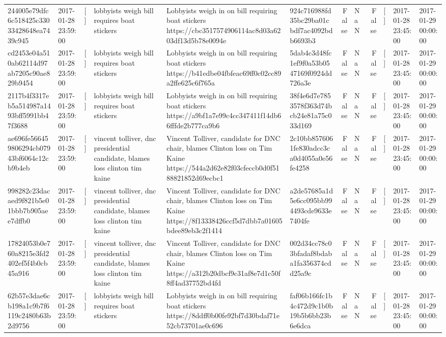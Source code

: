 \begin{tabular}{llllllrlrlll}
244005e79dfc6c518425c33033428648ea7439c945 & 2017-01-28 23:59:00 & [] & lobbyists weigh bill requires boat stickers & Lobbyists weigh in on bill requiring boat stickers https://cbc3517574906114ac8d03a6203df13d5b78e0094e & 924c716988fd35bc29ba01cbdf7ac4092bdb6693b3 & False & NaN & False & [] & 2017-01-28 23:45:00 & 2017-01-29 00:00:00 \\
cd2453e04a510ab62114d97ab7205c90ae829b9454 & 2017-01-28 23:59:00 & [] & lobbyists weigh bill requires boat stickers & Lobbyists weigh in on bill requiring boat stickers https://b41edbe04fbfeac69ff0c02cc89a2ffe625c6f765a & 5dab4c3d48fc1ef9f0a53b0547169f0924dd726a3e & False & NaN & False & [] & 2017-01-28 23:45:00 & 2017-01-29 00:00:00 \\
2117b4f3317eb5a514987a1493bff5991bb47f3688 & 2017-01-28 23:59:00 & [] & lobbyists weigh bill requires boat stickers & Lobbyists weigh in on bill requiring boat stickers https://a9bf1a7e99c4cc347411f14db66fffde2b777ca9b6 & 38f4e6d7e7853578f363d74bcb24e81a75c033d169 & False & NaN & False & [] & 2017-01-28 23:45:00 & 2017-01-29 00:00:00 \\
ae696fe566459806294cb07943bf6064c12cb9b4eb & 2017-01-28 23:59:00 & [] & vincent tolliver, dnc presidential candidate, blames loss clinton tim kaine & Vincent Tolliver, candidate for DNC chair, blames Clinton loss on Tim Kaine https://544a2d62e82f03cfeccb0d0f5188821852d69ecbc1 & 2c10bb8576061fe830adcc3ca0d4055a0e56fe4258 & False & NaN & False & [] & 2017-01-28 23:45:00 & 2017-01-29 00:00:00 \\
998282c23dacaed9f821b5e01bbb7b905aee7dffb0 & 2017-01-28 23:59:00 & [] & vincent tolliver, dnc presidential candidate, blames loss clinton tim kaine & Vincent Tolliver, candidate for DNC chair, blames Clinton loss on Tim Kaine https://8f13338426ccf5d7dbb7a01605bdee89eb3c2f1414 & a2de57685a1d5e6cc095bb994493cde9633e7404fe & False & NaN & False & [] & 2017-01-28 23:45:00 & 2017-01-29 00:00:00 \\
17824053b0e760a8215e3fd2402ef5f4b0cb45a916 & 2017-01-28 23:59:00 & [] & vincent tolliver, dnc presidential candidate, blames loss clinton tim kaine & Vincent Tolliver, candidate for DNC chair, blames Clinton loss on Tim Kaine https://a312b20dbcf9c31af8e7d1c50f8ff4ad37752bd4fd & 002d34cc78c03bfadaf8bdaba1fa356374cdd25a9c & False & NaN & False & [] & 2017-01-28 23:45:00 & 2017-01-29 00:00:00 \\
62b57e3dae6cb198a1c9b7f6119c2480b63b2d9756 & 2017-01-28 23:59:00 & [] & lobbyists weigh bill requires boat stickers & Lobbyists weigh in on bill requiring boat stickers https://8ddff0b00fe92bf7d30bdaf71e52cb73701ae0c696 & faf06b166fc1b4c472d9c1b0b19b5b6bb23b6e6dca & False & NaN & False & [] & 2017-01-28 23:45:00 & 2017-01-29 00:00:00 \\

\end{tabular}

